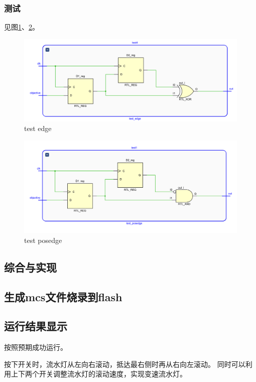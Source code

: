\documentclass[UTF8]{article}
\begin{document}
\subsubsection{测试}

见图\ref{FIG.10}、\ref{FIG.11}。

\begin{figure}[H]
    \centering
    \includegraphics[scale=0.4]{test_edge.PNG}
    \caption{test edge}
    \label{FIG.10}
\end{figure}
\begin{figure}[H]
    \centering
    \includegraphics[scale=0.4]{test_posedge.PNG}
    \caption{test posedge}
    \label{FIG.11}
\end{figure}
\subsection{综合与实现}
\subsection{生成mcs文件烧录到flash}
\subsection{运行结果显示}
按照预期成功运行。

按下开关时，流水灯从左向右滚动，抵达最右侧时再从右向左滚动。
同时可以利用上下两个开关调整流水灯的滚动速度，实现变速流水灯。
\end{document}
